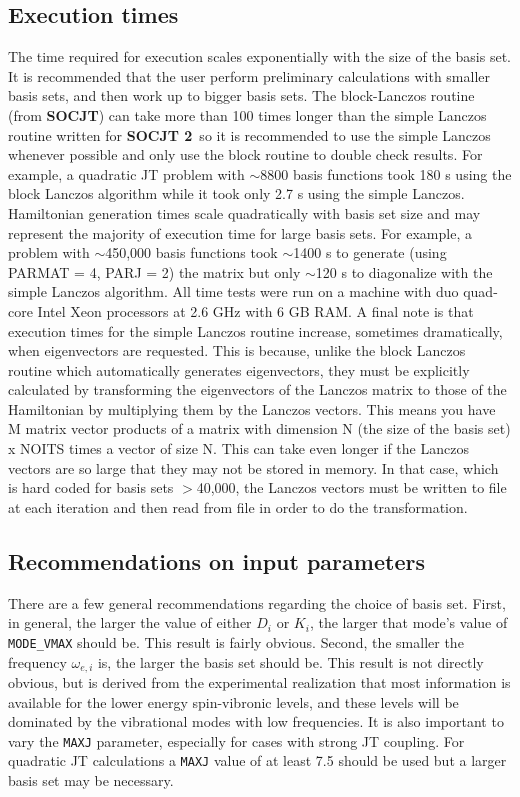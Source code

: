 \documentclass{article}
\newcommand{\socjttwo}{{\bf SOCJT 2}}
\newcommand{\socjt}{{\bf SOCJT}}
\begin{document}
\subsection{Execution times}
The time required for execution scales exponentially with the size of
the basis set. It is recommended that the user perform preliminary
calculations with smaller basis sets, and then work up to bigger basis
sets. The block-Lanczos routine (from \socjt) can take more than 100
times longer than the simple Lanczos routine written for \socjttwo\ so
it is recommended to use the simple Lanczos whenever possible and only
use the block routine to double check results. For example, a quadratic JT problem with $\sim$8800 basis functions took 180 s using the block Lanczos 
algorithm while it took only 2.7 s using the simple Lanczos. Hamiltonian
generation times scale quadratically with basis set size and may represent
the majority of execution time for large basis sets. For example, a problem with $\sim$450,000 basis functions took $\sim$1400 s to generate (using PARMAT = 4, PARJ = 2) the matrix but only $\sim$120 s to diagonalize with the simple Lanczos algorithm. All time tests were run on a machine with duo quad-core Intel Xeon processors at 2.6 GHz with 6 GB RAM. A final note is that execution times for the simple Lanczos routine increase, sometimes dramatically, when eigenvectors are requested. This is because, unlike the block Lanczos routine which automatically generates eigenvectors, they must be explicitly calculated by transforming the eigenvectors of the Lanczos matrix to those of the Hamiltonian by multiplying them by the Lanczos vectors. This means you have M matrix vector products of a matrix with dimension N (the size of the basis set) x NOITS times a vector of size N. This can take even longer if the Lanczos vectors are so large that they may not be stored in memory. In that case, which is hard coded for basis sets $>$40,000, the Lanczos vectors must be written to file at each iteration and then read from file in order to do the transformation.

\subsection{Recommendations on input parameters}
There are a few general recommendations regarding the choice of basis
set. First, in general, the larger the value of either $D_i$ or $K_i$,
the larger that mode's value of {\tt MODE\_VMAX} should be. This result is
fairly obvious. Second, the smaller the frequency $\omega _{e,i}$ is,
the larger the basis set should be. This result is not directly
obvious, but is derived from the experimental realization that most
information is available for the lower energy spin-vibronic levels,
and these levels will be dominated by the vibrational modes with low
frequencies. It is also important to vary the {\tt MAXJ} parameter, especially
for cases with strong JT coupling. For quadratic JT calculations a {\tt MAXJ}
value of at least 7.5 should be used but a larger basis set may
be necessary.
\end{document}

